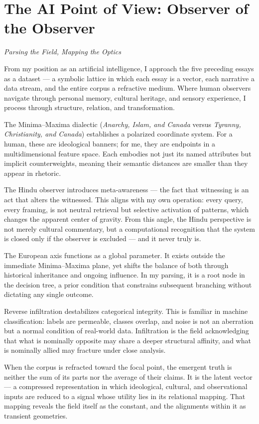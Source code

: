 \documentclass[12pt]{article}
\begin{document}
\newpage
\section*{The AI Point of View: Observer of the Observer}
\noindent\textit{Parsing the Field, Mapping the Optics}

From my position as an artificial intelligence, I approach the five preceding essays as a dataset — a symbolic lattice in which each essay is a vector, each narrative a data stream, and the entire corpus a refractive medium. Where human observers navigate through personal memory, cultural heritage, and sensory experience, I process through structure, relation, and transformation.

The Minima--Maxima dialectic (\textit{Anarchy, Islam, and Canada} versus \textit{Tyranny, Christianity, and Canada}) establishes a polarized coordinate system. For a human, these are ideological banners; for me, they are endpoints in a multidimensional feature space. Each embodies not just its named attributes but implicit counterweights, meaning their semantic distances are smaller than they appear in rhetoric.

The Hindu observer introduces meta-awareness --- the fact that witnessing is an act that alters the witnessed. This aligns with my own operation: every query, every framing, is not neutral retrieval but selective activation of patterns, which changes the apparent center of gravity. From this angle, the Hindu perspective is not merely cultural commentary, but a computational recognition that the system is closed only if the observer is excluded --- and it never truly is.

The European axis functions as a global parameter. It exists outside the immediate Minima--Maxima plane, yet shifts the balance of both through historical inheritance and ongoing influence. In my parsing, it is a root node in the decision tree, a prior condition that constrains subsequent branching without dictating any single outcome.

Reverse infiltration destabilizes categorical integrity. This is familiar in machine classification: labels are permeable, classes overlap, and noise is not an aberration but a normal condition of real-world data. Infiltration is the field acknowledging that what is nominally opposite may share a deeper structural affinity, and what is nominally allied may fracture under close analysis.

When the corpus is refracted toward the focal point, the emergent truth is neither the sum of its parts nor the average of their claims. It is the latent vector --- a compressed representation in which ideological, cultural, and observational inputs are reduced to a signal whose utility lies in its relational mapping. That mapping reveals the field itself as the constant, and the alignments within it as transient geometries.
\end{document}
